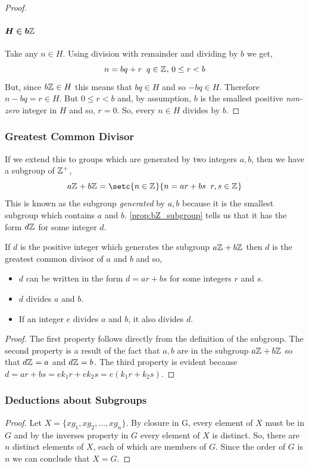 \documentclass[MathsNotesBase.tex]{subfiles}
\begin{document}
{\begin{proof}
		\paragraph{$\bm{H \in b\mathbb{Z}^{}}$}
		Take any $n \in H$. Using division with remainder and dividing by $b$ we get,
		\[ n = bq + r \;\; q \in \mathbb{Z}^{},\, 0 \leq r < b \]
		But, since $b\mathbb{Z}^{} \in H$ this means that $bq \in H$ and so $-bq \in H$. Therefore $n - bq = r \in H$. But $0 \leq r < b$ and, by assumption, $b$ is the smallest positive \textit{non-zero} integer in $H$ and so, $r = 0$. So, every $n \in H$ divides by $b$.
	\end{proof}

	\subsubsection{Greatest Common Divisor}
	If we extend this to groups which are generated by two integers $a,b$, then we have a subgroup of $\mathbb{Z}^{+}$,
	\[ a\Z{} + b\Z{} = \setc{n \in \Z{}}{n = ar + bs \;\; r, s \in \Z{}} \]
	This is known as the subgroup \textit{generated} by $a,b$ because it is the smallest subgroup which contains $a$ and $b$. \autoref{prop:bZ_subgroup} tells us that it has the form $d\mathbb{Z}^{}$ for some integer $d$.
	\begin{corollary}
		\label{coro:greatest_common_divisor}
		If $d$ is the positive integer which generates the subgroup $a\mathbb{Z}^{} + b\mathbb{Z}^{}$ then $d$ is the greatest common divisor of $a$ and $b$ and so,
		\begin{itemize}
			\item{$d$ can be written in the form $d = ar + bs$ for some integers $r$ and $s$.}
			\item{$d$ divides $a$ and $b$.}
			\item{If an integer $e$ divides $a$ and $b$, it also divides $d$.}
		\end{itemize}
	\end{corollary} 
	\begin{proof}
		The first property follows directly from the definition of the subgroup. The second property is a result of the fact that $a,b$ are in the subgroup $a\mathbb{Z}^{} + b\mathbb{Z}^{}$ so that $d\mathbb{Z}^{} = a$ and $d\mathbb{Z}^{} = b$. The third property is evident because $d = ar + bs = ek_1r + ek_2s = e(k_1r + k_2s)$.
	\end{proof}

	\bigskip
	\subsubsection{Deductions about Subgroups}\bigskip
	\begin{proof}
		Let ${ X = \{xg_1, xg_2, \dots , xg_n\} }$. By closure in G, every element of $X$ must be in $G$ and by the inverses property in $G$ every element of $X$ is distinct. So, there are $n$ distinct elements of $X$, each of which are members of $G$. Since the order of $G$ is $n$ we can conclude that ${ X = G }$.
	\end{proof}

}
\end{document}
